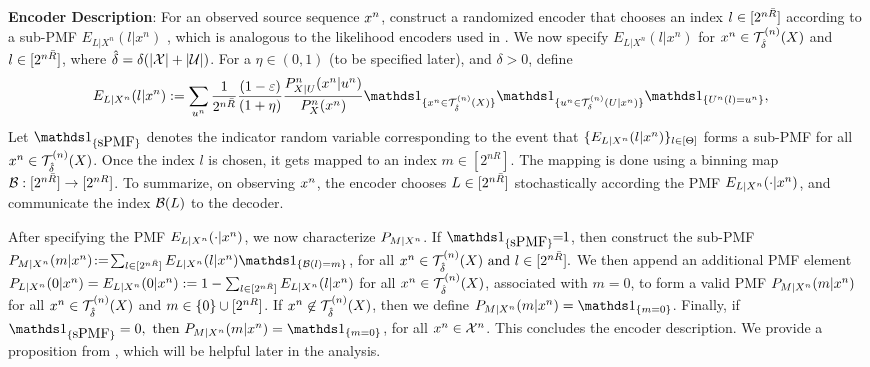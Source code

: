 \vspace{5pt}
\noindent \textbf{Encoder Description}:
For an observed source sequence $x^n$, construct a randomized encoder that chooses an index $l \in [2^{n\bar{R}}]$ according to a sub-PMF $E_{L|X^n}(l|x^n)$
, which is analogous to the likelihood encoders used in  \cite{cuff2013distributed, atif2022source,sohail2023unique}. We now specify $E_{L|X^n}(l|x^n)$ for $x^n\in \mathcal{T}_{\hat{\delta}}^{(n)}({X})$ and $l\in[2^{n\bar{R}}]$, where $\hat{\delta} = \delta(|\mathcal{X}| + |\mathcal{U}|)$. For a  $\eta \in (0,1)$ (to be specified later), and $\delta>0$, define
\begin{align}
 E_{L|X^n}&(l|x^n) \deq \sum_{\un}   \frac{1}{2^{n\Rbar}}\frac{(1-\varepsilon)}{(1+\eta)}\frac{P^n_{X|U}(x^n|u^n)}{\px^n(x^n)}\I_{\{\xn\in \Tx\}} 
  \I_{\{\un \in \Tucond\}}
  \I_{\{\Un(l) = \un\}},\nonumber
\end{align}
Let $\Ipmf$ denotes the indicator random variable corresponding to the event 
that $\{E_{L|X^n}(l|x^n)\}_{l \in [\Theta]}$ forms a sub-PMF for all $x^n\in\mathcal{T}_{\hat{\delta}}^{(n)}({X}) $. Once the index $l$ is chosen, it gets mapped to an index $m \in [2^{nR}]$. The mapping is done using a binning map $\mathcal{B}:[2^{n\bar{R}}] \rightarrow [2^{nR}]$. To summarize, on observing $x^n$, the encoder chooses $L \in [2^{n\bar{R}}]$ stochastically according the PMF $E_{L|X^n}(\cdot|x^n)$, and communicate the index $\mathcal{B}(L)$ to the decoder. 

\vspace{3pt}
\noindent After specifying the PMF $E_{L|X^n}(\cdot|x^n)$, we now characterize $P_{M|X^n}$. If $\Ipmf \!\! = \!\! 1$, then construct the sub-PMF $P_{M|\Xn}(m|\xn) \!\deq\! \sum_{l \in [2^{n\Rbar}]}E_{L|\Xn}(l|\xn) \I_{\set{\calB(l) = m}}$, for all $x^n\in\mathcal{T}_{\hat{\delta}}^{(n)}({X}) \text{ and } l\in [2^{n\bar{R}}].$ We then append an additional PMF element $P_{L|X^n}(0|x^n) = E_{L|X^n}(0|x^n) := 1-\sum_{l\in[2^{n\bar{R}}]} E_{L|X^n}(l|x^n)$ for all $x^n \in \mathcal{T}_{\hat{\delta}}^{(n)}({X})$, associated with $m=0$, to form a valid PMF $P_{M|X^n}(m|x^n)$ for all $x^n \in \mathcal{T}_{\hat{\delta}}^{(n)}({X})$ and $ m\in\{0\} \cup [2^{nR}]$. If $x^n \not \in \mathcal{T}_{\hat{\delta}}^{(n)}({X})$, then we define $P_{M|\Xn}(m|\xn) = \I_{\set{m=0}}$. Finally, if $\Ipmf = 0, \text{ then } P_{M|\Xn}(m|\xn) = \I_{\{m=0\}}$, for all $x^n \in \mathcal{X}^n$. This concludes the encoder description. We provide a proposition from \cite{atif2023lossy}, which will be helpful later in the analysis.

